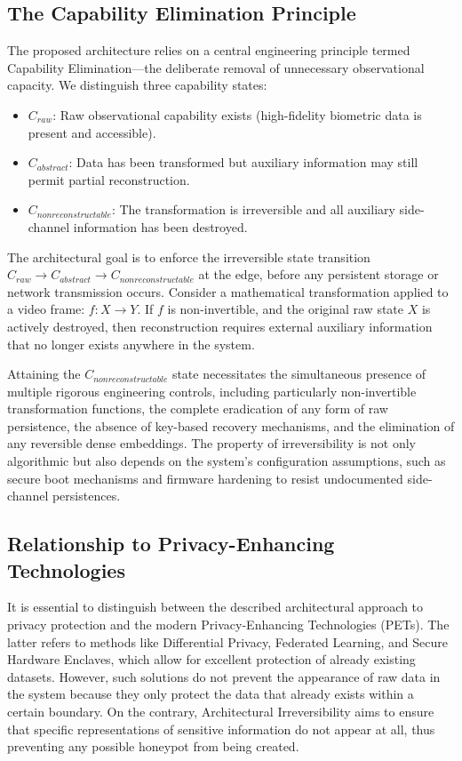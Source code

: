 \documentclass[conference]{IEEEtran}
\begin{document}
\subsection{The Capability Elimination Principle}
The proposed architecture relies on a central engineering principle termed Capability Elimination---the deliberate removal of unnecessary observational capacity. We distinguish three capability states:
\begin{itemize}
    \item $C_{raw}$: Raw observational capability exists (high-fidelity biometric data is present and accessible).
    \item $C_{abstract}$: Data has been transformed but auxiliary information may still permit partial reconstruction.
    \item $C_{nonreconstructable}$: The transformation is irreversible and all auxiliary side-channel information has been destroyed.
\end{itemize}
The architectural goal is to enforce the irreversible state transition $C_{raw} \rightarrow C_{abstract} \rightarrow C_{nonreconstructable}$ at the edge, before any persistent storage or network transmission occurs. Consider a mathematical transformation applied to a video frame: $f: X \rightarrow Y$. If $f$ is non-invertible, and the original raw state $X$ is actively destroyed, then reconstruction requires external auxiliary information that no longer exists anywhere in the system.

Attaining the $C_{nonreconstructable}$ state necessitates the simultaneous presence of multiple rigorous engineering controls, including particularly non-invertible transformation functions, the complete eradication of any form of raw persistence, the absence of key-based recovery mechanisms, and the elimination of any reversible dense embeddings. The property of irreversibility is not only algorithmic but also depends on the system's configuration assumptions, such as secure boot mechanisms and firmware hardening to resist undocumented side-channel persistences.

\subsection{Relationship to Privacy-Enhancing Technologies}
It is essential to distinguish between the described architectural approach to privacy protection and the modern Privacy-Enhancing Technologies (PETs). The latter refers to methods like Differential Privacy, Federated Learning, and Secure Hardware Enclaves, which allow for excellent protection of already existing datasets. However, such solutions do not prevent the appearance of raw data in the system because they only protect the data that already exists within a certain boundary. On the contrary, Architectural Irreversibility aims to ensure that specific representations of sensitive information do not appear at all, thus preventing any possible honeypot from being created.
\end{document}
